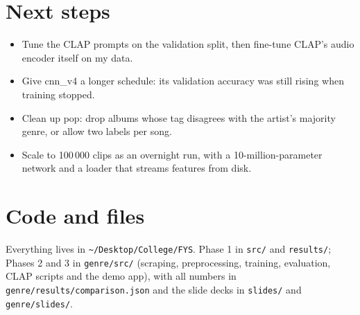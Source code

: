 \documentclass[11pt]{article}
\begin{document}
\section{Next steps}
\begin{itemize}
  \item Tune the CLAP prompts on the validation split, then fine-tune CLAP's audio encoder itself on my data.
  \item Give cnn\_v4 a longer schedule: its validation accuracy was still rising when training stopped.
  \item Clean up pop: drop albums whose tag disagrees with the artist's majority genre, or allow two labels per song.
  \item Scale to 100\,000 clips as an overnight run, with a 10-million-parameter network and a loader that streams features from disk.
\end{itemize}

\section*{Code and files}
Everything lives in \texttt{\textasciitilde/Desktop/College/FYS}. Phase 1 in \texttt{src/} and \texttt{results/}; Phases 2 and 3 in \texttt{genre/src/} (scraping, preprocessing, training, evaluation, CLAP scripts and the demo app), with all numbers in \texttt{genre/results/comparison.json} and the slide decks in \texttt{slides/} and \texttt{genre/slides/}.
\end{document}
